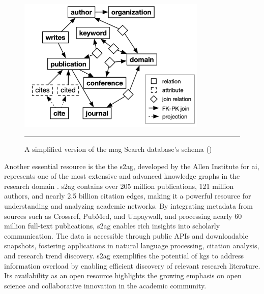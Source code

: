 \begin{figure}[htbp]
    \centering
 \includegraphics[width=0.8\textwidth]{figures/literature-review/mag-schema.png}
     \rule{35em}{0.5pt}
    \caption{A simplified version of the \gls{mag} Search database's schema (\textcite{Baik2019})} 
 \label{fig:mag-schema}
\end{figure}

Another essential resource is the the \gls{s2ag}, developed by the Allen Institute for \acrlong{ai}, represents one of the most extensive and advanced knowledge graphs in the research domain \cite{S2AG}.
\gls{s2ag} contains over 205 million publications, 121 million authors, and nearly 2.5 billion citation edges, making it a powerful resource for understanding and analyzing academic networks.
By integrating metadata from sources such as Crossref, PubMed, and Unpaywall, and processing nearly 60 million full-text publications, \gls{s2ag} enables rich insights into scholarly communication.
The data is accessible through public APIs and downloadable snapshots, fostering applications in natural language processing, citation analysis, and research trend discovery.
\gls{s2ag} exemplifies the potential of \glspl{kg} to address information overload by enabling efficient discovery of relevant research literature.
Its availability as an open resource highlights the growing emphasis on open science and collaborative innovation in the academic community.

